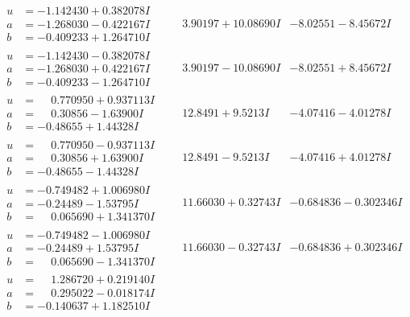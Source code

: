 \documentclass[1p]{elsarticle_modified}
\theoremstyle{definition}
\begin{document}
$$\begin{array}{c|c|c}
\begin{aligned}
u &= -1.142430 + 0.382078 I \\
a &= -1.268030 - 0.422167 I \\
b &= -0.409233 + 1.264710 I\end{aligned}
 & \phantom{-}3.90197 + 10.08690 I & -8.02551 - 8.45672 I \\ \hline\begin{aligned}
u &= -1.142430 - 0.382078 I \\
a &= -1.268030 + 0.422167 I \\
b &= -0.409233 - 1.264710 I\end{aligned}
 & \phantom{-}3.90197 - 10.08690 I & -8.02551 + 8.45672 I \\ \hline\begin{aligned}
u &= \phantom{-}0.770950 + 0.937113 I \\
a &= \phantom{-}0.30856 - 1.63900 I \\
b &= -0.48655 + 1.44328 I\end{aligned}
 & \phantom{-}12.8491 + 9.5213 I & -4.07416 - 4.01278 I \\ \hline\begin{aligned}
u &= \phantom{-}0.770950 - 0.937113 I \\
a &= \phantom{-}0.30856 + 1.63900 I \\
b &= -0.48655 - 1.44328 I\end{aligned}
 & \phantom{-}12.8491 - 9.5213 I & -4.07416 + 4.01278 I \\ \hline\begin{aligned}
u &= -0.749482 + 1.006980 I \\
a &= -0.24489 - 1.53795 I \\
b &= \phantom{-}0.065690 + 1.341370 I\end{aligned}
 & \phantom{-}11.66030 + 0.32743 I & -0.684836 - 0.302346 I \\ \hline\begin{aligned}
u &= -0.749482 - 1.006980 I \\
a &= -0.24489 + 1.53795 I \\
b &= \phantom{-}0.065690 - 1.341370 I\end{aligned}
 & \phantom{-}11.66030 - 0.32743 I & -0.684836 + 0.302346 I \\ \hline\begin{aligned}
u &= \phantom{-}1.286720 + 0.219140 I \\
a &= \phantom{-}0.295022 - 0.018174 I \\
b &= -0.140637 + 1.182510 I\end{aligned}

\end{array}$$
\end{document}
